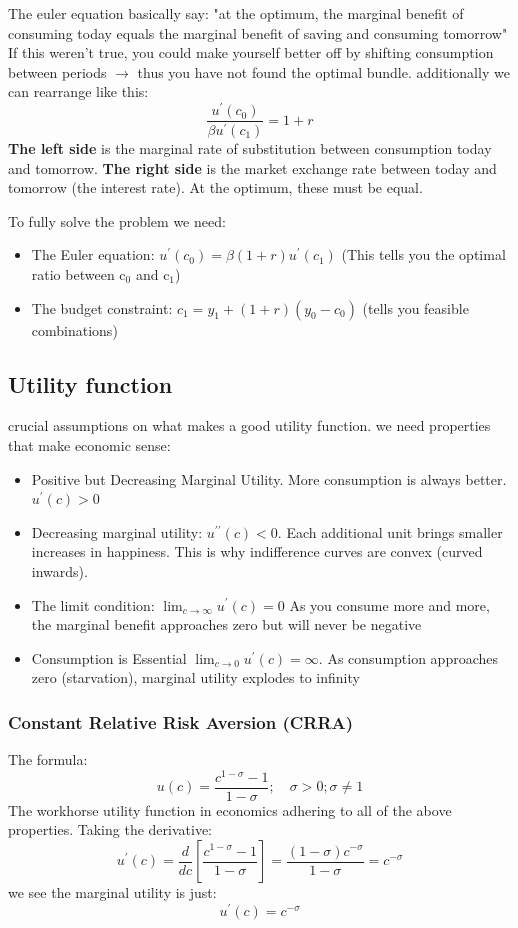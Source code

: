 \documentclass[12pt]{article}
\begin{document}
The euler equation basically say: "at the optimum, the marginal benefit of consuming today equals the marginal benefit of saving and consuming tomorrow"
If this weren't true, you could make yourself better off by shifting consumption between periods $\rightarrow$ thus you have not found the optimal bundle. additionally we can rearrange like this:
$$
\frac{u^{\prime}\left(c_0\right)}{\beta u^{\prime}\left(c_1\right)}=1+r
$$
\textbf{The left side} is the marginal rate of substitution between consumption today and tomorrow. \textbf{The right side} is the market exchange rate between today and tomorrow (the interest rate). At the optimum, these must be equal.

To fully solve the problem we need:
\begin{itemize}
    \item The Euler equation: $u^{\prime}\left(c_0\right)=\beta(1+r) u^{\prime}\left(c_1\right)$ (This tells you the optimal ratio between $\mathrm{c}_0$ and $\mathrm{c}_1$)
    \item The budget constraint: $c_1=y_1+(1+r)\left(y_0-c_0\right)$ (tells you feasible combinations)
\end{itemize}

\subsection{Utility function}
crucial assumptions on what makes a good utility function. we need properties that make economic sense: 
\begin{itemize}
    \item Positive but Decreasing Marginal Utility. More consumption is always better. $u^{\prime}(c)>0$
    \item Decreasing marginal utility: $u^{\prime \prime}(c)<0$. Each additional unit brings smaller increases in happiness. This is why indifference curves are convex (curved inwards).
    \item The limit condition: $\lim _{c \rightarrow \infty} u^{\prime}(c)=0$ As you consume more and more, the marginal benefit approaches zero but will never be negative
    \item Consumption is Essential $\lim _{c \rightarrow 0} u^{\prime}(c)=\infty$. As consumption approaches zero (starvation), marginal utility explodes to infinity
\end{itemize}{}

\subsubsection{Constant Relative Risk Aversion (CRRA)}
The formula:
$$
u(c)=\frac{c^{1-\sigma}-1}{1-\sigma} ; \quad \sigma>0 ; \sigma \neq 1
$$
The workhorse utility function in economics adhering to all of the above properties. Taking the derivative:
$$
u^{\prime}(c)=\frac{d}{d c}\left[\frac{c^{1-\sigma}-1}{1-\sigma}\right]=\frac{(1-\sigma) c^{-\sigma}}{1-\sigma}=c^{-\sigma}
$$
we see the marginal utility is just:
$$
u^{\prime}(c)=c^{-\sigma}
$$
\end{document}
